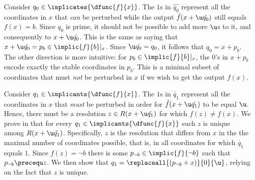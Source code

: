 \documentclass[acmsmall, nonacm, authorversion]{acmart}
\begin{document}
Consider $q_0\in\implicates{\dfunc{f}{x}}$. The $1$s in $\hat{q_0}$ represent all the coordinates in $x$ that \emph{can} be perturbed while the output $\tilde{f}(x+\u\hat{q_0})$ still equals $f(x)=b$. Since $q_0$ is prime, it should not be possible to add more $\u$s to it, and consequently to $x+\u\hat{q_0}$. This is the same as saying that $x+\u\hat{q_0}=p_b \in \implic{f}{b}|_x$. Since $\u\hat{q_0}=q_0$, it follows that $q_0=x+p_b$. The other direction is more intuitive: for $p_b \in \implic{f}{b}|_x$, the $0$'s in $x + p_b$ encode exactly the stable coordinates in $p_b$. This is a minimal subset of coordinates that must \emph{not} be perturbed in $x$ if we wish to get the output $f(x)$.

Consider $q_1\in \implicants{\dfunc{f}{x}}$. The $1$s in $\check{q_1}$ represent all the coordinates in $x$ that \emph{must} be perturbed in order for $\tilde{f}(x+\u\check{q_1})$ to be equal $\u$. Hence, there must be a resolution $z\in R(x+\u\check{q_1})$ for which $f(z)\neq f(x)$. We prove in  that for every $q_1\in \implicants{\dfunc{f}{x}}$ such $z$ is unique among $R(x+\u\check{q_1})$. Specifically, $z$ is the resolution that differs from $x$ in the the maximal number of coordinates possible, that is, in all coordinates for which $\check{q_1}$ equals $1$. Since $f(z)=\neg b$ there is some $p_{\neg b}\in \implic{f}{\neg b}$ such that $p_{\neg b}\precequ z$. We then show that $q_1=\replaceall{(p_{\neg b}+x)}{0}{\u}$, relying on the fact that $z$ is unique.
\end{document}
